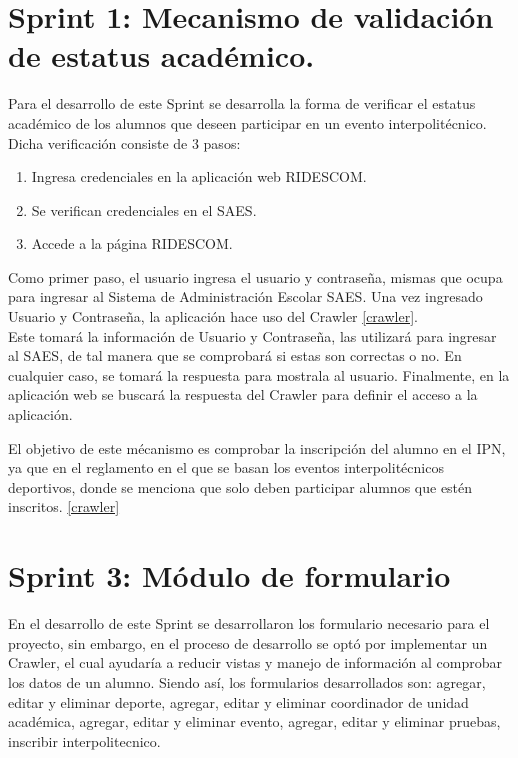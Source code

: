 	\section{Sprint 1:  Mecanismo de validación de estatus académico.}
	\noindent Para el desarrollo de este Sprint se desarrolla la forma de verificar el estatus académico de los alumnos que deseen participar en un evento interpolitécnico. \\
	Dicha verificación consiste de 3 pasos:
	\begin{enumerate}
		\item Ingresa credenciales en la aplicación web RIDESCOM.
		\item Se verifican credenciales en el SAES.
		\item Accede a la página RIDESCOM.
	\end{enumerate}
	
	Como primer paso, el usuario ingresa el usuario y contraseña, mismas que ocupa para ingresar al Sistema de Administración Escolar SAES.
	Una vez ingresado Usuario y Contraseña, la aplicación hace uso del Crawler \ref{crawler}. \\
	Este tomará la información de Usuario y Contraseña, las utilizará para ingresar al SAES, de tal manera que se comprobará si estas son correctas o no. En cualquier caso, se tomará la respuesta para mostrala al usuario.
	Finalmente, en la aplicación web se buscará la respuesta del Crawler para definir el acceso a la aplicación.
	
	El objetivo de este mécanismo es comprobar la inscripción del alumno en el IPN, ya que en el reglamento en el que se basan los eventos interpolitécnicos deportivos, donde se menciona que solo deben participar alumnos que estén inscritos. \ref{crawler}
	
	
	\section{Sprint 3: Módulo de formulario}	
	\noindent En el desarrollo de este Sprint se desarrollaron los formulario necesario para el proyecto, sin embargo, en el proceso de desarrollo se optó por implementar un Crawler, el cual ayudaría a reducir vistas y manejo de información al comprobar los datos de un alumno. Siendo así, los formularios desarrollados son: agregar, editar y eliminar deporte, agregar, editar y eliminar coordinador de unidad académica, agregar, editar y eliminar evento, agregar, editar y eliminar pruebas, inscribir interpolitecnico.
	
	